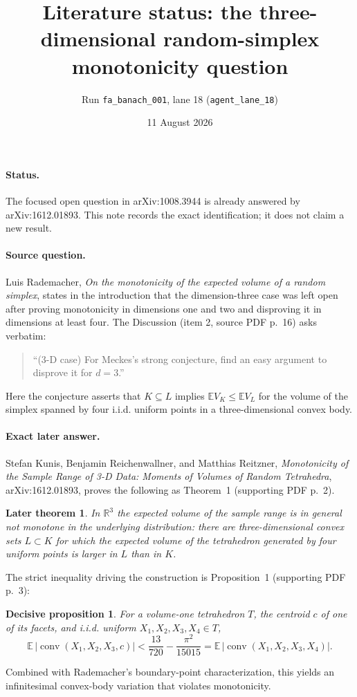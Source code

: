 \documentclass[11pt]{article}
\title{Literature status: the three-dimensional random-simplex monotonicity question}
\author{Run \texttt{fa\_banach\_001}, lane 18 (\texttt{agent\_lane\_18})}
\date{11 August 2026}
\newtheorem*{theorem}{Later theorem}
\newtheorem*{proposition}{Decisive proposition}
\begin{document}
\maketitle

\paragraph{Status.}
The focused open question in arXiv:1008.3944 is already answered by
arXiv:1612.01893.  This note records the exact identification; it does not claim
a new result.

\paragraph{Source question.}
Luis Rademacher, \emph{On the monotonicity of the expected volume of a random
simplex}, states in the introduction that the dimension-three case was left
open after proving monotonicity in dimensions one and two and disproving it in
dimensions at least four.  The Discussion (item 2, source PDF p.~16) asks
verbatim:
\begin{quote}
``(3-D case) For Meckes's strong conjecture, find an easy argument to disprove
it for $d=3$.''
\end{quote}
Here the conjecture asserts that $K\subseteq L$ implies
$\mathbb E V_K\leq \mathbb E V_L$ for the volume of the simplex spanned by four
i.i.d. uniform points in a three-dimensional convex body.

\paragraph{Exact later answer.}
Stefan Kunis, Benjamin Reichenwallner, and Matthias Reitzner,
\emph{Monotonicity of the Sample Range of 3-D Data: Moments of Volumes of
Random Tetrahedra}, arXiv:1612.01893, proves the following as Theorem~1
(supporting PDF p.~2).
\begin{theorem}
In $\mathbb R^3$ the expected volume of the sample range is in general not
monotone in the underlying distribution: there are three-dimensional convex
sets $L\subset K$ for which the expected volume of the tetrahedron generated by
four uniform points is larger in $L$ than in $K$.
\end{theorem}
The strict inequality driving the construction is Proposition~1 (supporting
PDF p.~3):
\begin{proposition}
For a volume-one tetrahedron $T$, the centroid $c$ of one of its facets, and
i.i.d. uniform $X_1,X_2,X_3,X_4\in T$,
\[
 \mathbb E\,\lvert\operatorname{conv}(X_1,X_2,X_3,c)\rvert
 < \frac{13}{720}-\frac{\pi^2}{15015}
 = \mathbb E\,\lvert\operatorname{conv}(X_1,X_2,X_3,X_4)\rvert.
\]
\end{proposition}
Combined with Rademacher's boundary-point characterization, this yields an
infinitesimal convex-body variation that violates monotonicity.
\end{document}
